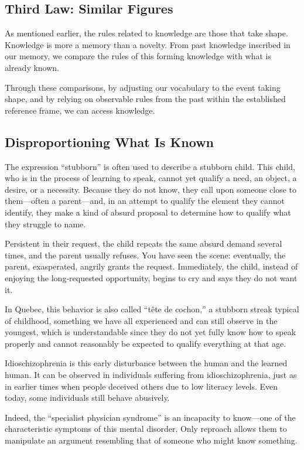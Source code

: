 \documentclass[12pt,oneside]{article}
\begin{document}
\subsection{Third Law: Similar Figures}

As mentioned earlier, the rules related to knowledge are those that take shape. Knowledge is more a memory than a novelty. From past knowledge inscribed in our memory, we compare the rules of this forming knowledge with what is already known.

Through these comparisons, by adjusting our vocabulary to the event taking shape, and by relying on observable rules from the past within the established reference frame, we can access knowledge.

\subsection{Disproportioning What Is Known}

The expression “stubborn” is often used to describe a stubborn child. This child, who is in the process of learning to speak, cannot yet qualify a need, an object, a desire, or a necessity. Because they do not know, they call upon someone close to them—often a parent—and, in an attempt to qualify the element they cannot identify, they make a kind of absurd proposal to determine how to qualify what they struggle to name.

Persistent in their request, the child repeats the same absurd demand several times, and the parent usually refuses. You have seen the scene: eventually, the parent, exasperated, angrily grants the request. Immediately, the child, instead of enjoying the long‑requested opportunity, begins to cry and says they do not want it.

In Quebec, this behavior is also called “tête de cochon,” a stubborn streak typical of childhood, something we have all experienced and can still observe in the youngest, which is understandable since they do not yet fully know how to speak properly and cannot reasonably be expected to qualify everything at that age.

Idioschizophrenia is this early disturbance between the human and the learned human. It can be observed in individuals suffering from idioschizophrenia, just as in earlier times when people deceived others due to low literacy levels. Even today, some individuals still behave abusively.

Indeed, the “specialist physician syndrome” is an incapacity to know—one of the characteristic symptoms of this mental disorder. Only reproach allows them to manipulate an argument resembling that of someone who might know something.
\end{document}
